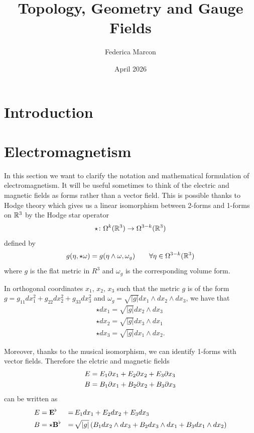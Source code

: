 \documentclass{article}
\title{Topology, Geometry and Gauge Fields}
\author{Federica Marcon}
\date{April 2026}
\theoremstyle{definition}
\theoremstyle{remark}
\begin{document}
\maketitle

\section{Introduction}

\section{Electromagnetism}
In this section we want to clarify the notation and mathematical formulation of electromagnetism. It will be useful sometimes to think of the electric and magnetic fields as forms rather than a vector field. This is possible thanks to Hodge theory which gives us a linear isomorphism between 2-forms and 1-forms on \(\mathbb{R}^3\) by the Hodge star operator 
\[\star \colon \Omega^k(\mathbb{R}^3) \to \Omega^{3-k}(\mathbb{R}^3)\] defined by
\[g(\eta,\star\omega ) = g(\eta\wedge\omega, \omega_g) \qquad \forall\eta\in\Omega^{3-k}(\mathbb{R}^3)\]
where \(g\) is the flat metric in \(R^3\) and \(\omega_g\) is the corresponding volume form.

In orthogonal coordinates \(x_1,\, x_2, \, x_3\) such that the metric \(g\) is of the form \(g=g_{11}dx_1^2 + g_{22}dx_2^2 + g_{33}dx_3^2\) and \(\omega_g=\sqrt{|g|}dx_1\wedge dx_2\wedge dx_3\), we have that
\begin{equation}\label{hodgeop}
    \begin{aligned}
        \star dx_1=\sqrt{|g|} dx_2 \wedge dx_3 \\
        \star dx_2=\sqrt{|g|} dx_3 \wedge dx_1 \\
        \star dx_3=\sqrt{|g|} dx_1 \wedge dx_2.
    \end{aligned}
\end{equation}


Moreover, thanks to the musical isomorphism, we can identify 1-forms with vector fields. Therefore the elctric and magnetic fields
\begin{equation}\label{eqEBvec}
\begin{aligned}
    E & = E_1 \partial x_1 + E_2 \partial x_2 + E_3 \partial x_3 \\
    B & = B_1 \partial x_1 + B_2 \partial x_2 + B_3 \partial x_3
\end{aligned}
\end{equation}
can be written as
\begin{equation}\label{eqEBform}
\begin{aligned}
    E & = \mathbf{E}^\flat & = &\, E_1 dx_1 + E_2 dx_2 + E_3 dx_3 \\
    B & = \star \mathbf{B}^\flat & = &\, \sqrt{|g|} \left( B_1 dx_2\wedge dx_3 + B_2 dx_3\wedge dx_1 + B_3 dx_1\wedge dx_2 \right)
\end{aligned}
\end{equation}
\end{document}

